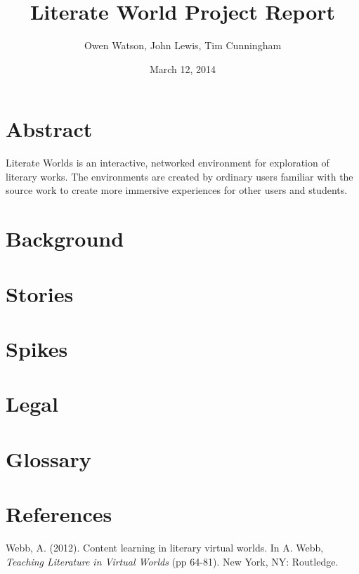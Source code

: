 \documentclass[12pt, letterpaper]{report}
\author{Owen Watson, John Lewis, Tim Cunningham}
\title{Literate World Project Report}
\date{March 12, 2014}
\begin{document}
	\begin{titlepage}
	\Huge \maketitle \par
	\end{titlepage}
	
	\chapter{Abstract}
	Literate Worlds is an interactive, networked environment for exploration of literary works. The environments are created by ordinary users familiar with the source work to create more immersive experiences for other users and students. \par
	
	\tableofcontents
	
	\chapter{Background}
	
	\chapter{Stories}
	
	\chapter{Spikes}
	
	\chapter{Legal}
	
	\chapter{Glossary}
	
	
	\chapter{References}
	\begin{bibliography}{9}

 	Webb, A. (2012). Content learning in literary virtual worlds.
  	In A. Webb, \emph{Teaching Literature in Virtual Worlds} 
  	(pp 64-81).
  	New York, NY: Routledge.

	\end{bibliography}

	
	
\end{document}
